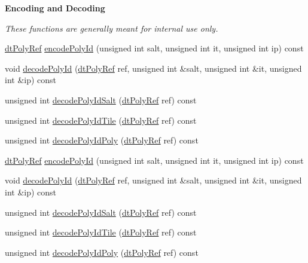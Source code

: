 \begin{Indent}\textbf{ Encoding and Decoding}\par
{\em These functions are generally meant for internal use only. }\begin{DoxyCompactItemize}
\item 
\hyperlink{group__detour_gab4e0b2257a670c1a800057999612b466}{dt\+Poly\+Ref} \hyperlink{classdtNavMesh_a168a479840e7e32613f4b68ee4662d78}{encode\+Poly\+Id} (unsigned int salt, unsigned int it, unsigned int ip) const
\item 
void \hyperlink{classdtNavMesh_afaaf5c22864cdf4a61d5e40a4efce43f}{decode\+Poly\+Id} (\hyperlink{group__detour_gab4e0b2257a670c1a800057999612b466}{dt\+Poly\+Ref} ref, unsigned int \&salt, unsigned int \&it, unsigned int \&ip) const
\item 
unsigned int \hyperlink{classdtNavMesh_a588b6f839fd249430cff02cea71f347c}{decode\+Poly\+Id\+Salt} (\hyperlink{group__detour_gab4e0b2257a670c1a800057999612b466}{dt\+Poly\+Ref} ref) const
\item 
unsigned int \hyperlink{classdtNavMesh_a94cfcf0015d7d6d856acaf96126cd349}{decode\+Poly\+Id\+Tile} (\hyperlink{group__detour_gab4e0b2257a670c1a800057999612b466}{dt\+Poly\+Ref} ref) const
\item 
unsigned int \hyperlink{classdtNavMesh_a936c3779e6cb7484e57dd106911eccc2}{decode\+Poly\+Id\+Poly} (\hyperlink{group__detour_gab4e0b2257a670c1a800057999612b466}{dt\+Poly\+Ref} ref) const
\item 
\hyperlink{group__detour_gab4e0b2257a670c1a800057999612b466}{dt\+Poly\+Ref} \hyperlink{classdtNavMesh_a168a479840e7e32613f4b68ee4662d78}{encode\+Poly\+Id} (unsigned int salt, unsigned int it, unsigned int ip) const
\item 
void \hyperlink{classdtNavMesh_afaaf5c22864cdf4a61d5e40a4efce43f}{decode\+Poly\+Id} (\hyperlink{group__detour_gab4e0b2257a670c1a800057999612b466}{dt\+Poly\+Ref} ref, unsigned int \&salt, unsigned int \&it, unsigned int \&ip) const
\item 
unsigned int \hyperlink{classdtNavMesh_a588b6f839fd249430cff02cea71f347c}{decode\+Poly\+Id\+Salt} (\hyperlink{group__detour_gab4e0b2257a670c1a800057999612b466}{dt\+Poly\+Ref} ref) const
\item 
unsigned int \hyperlink{classdtNavMesh_a94cfcf0015d7d6d856acaf96126cd349}{decode\+Poly\+Id\+Tile} (\hyperlink{group__detour_gab4e0b2257a670c1a800057999612b466}{dt\+Poly\+Ref} ref) const
\item 
unsigned int \hyperlink{classdtNavMesh_a936c3779e6cb7484e57dd106911eccc2}{decode\+Poly\+Id\+Poly} (\hyperlink{group__detour_gab4e0b2257a670c1a800057999612b466}{dt\+Poly\+Ref} ref) const
\end{DoxyCompactItemize}
\end{Indent}


